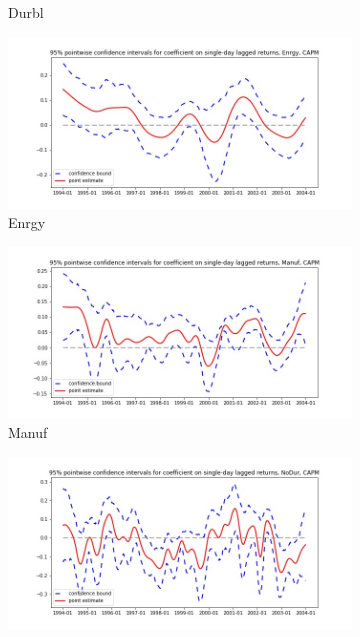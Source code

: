 \documentclass{article}
\begin{document}
\begin{figure}
\begin{subfigure}[b]{0.5\textwidth}
    \caption{Durbl}
    \label{fig:2}
  \end{subfigure}
  \begin{subfigure}[b]{0.5\textwidth}
    \centering
    \includegraphics[width=\textwidth]{Enrgy/pointwiseCIs_CAPM.jpg}
    \caption{Enrgy}
    \label{fig:2}
  \end{subfigure}
  \begin{subfigure}[b]{0.5\textwidth}
    \centering
    \includegraphics[width=\textwidth]{Manuf/pointwiseCIs_CAPM.jpg}
    \caption{Manuf}
    \label{fig:2}
  \end{subfigure}
  \begin{subfigure}[b]{0.5\textwidth}
    \centering
    \includegraphics[width=\textwidth]{NoDur/pointwiseCIs_CAPM.jpg}

\end{subfigure}
\end{figure}
\end{document}
